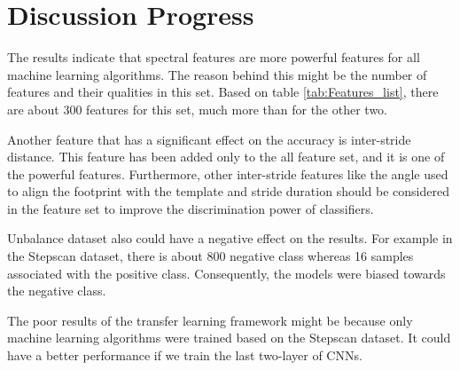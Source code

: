 \section{Discussion Progress}

The results indicate that spectral features are more powerful features for all machine learning algorithms. The reason behind this might be the number of features and their qualities in this set. Based on table \ref{tab:Features_list}, there are about 300 features for this set, much more than for the other two.

Another feature that has a significant effect on the accuracy is inter-stride distance. This feature has been added only to the all feature set, and it is one of the powerful features. Furthermore, other inter-stride features like the angle used to align the footprint with the template and stride duration should be considered in the feature set to improve the discrimination power of classifiers.  



Unbalance dataset also could have a negative effect on the results. For example in the Stepscan dataset, there is about 800 negative class whereas 16 samples associated with the positive class. Consequently, the models were biased towards the negative class. 

The poor results of the transfer learning framework might be because only machine learning algorithms were trained based on the Stepscan dataset. It could have a better performance if we train the last two-layer of CNNs. 












